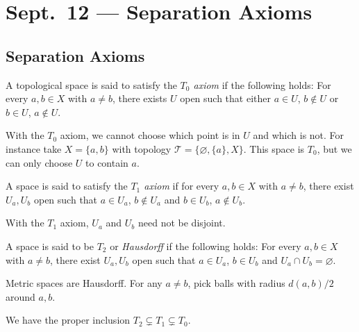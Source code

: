 \chapter{Sept.~12 --- Separation Axioms}

\section{Separation Axioms}
\begin{definition}
  A topological space is said to satisfy the
  \emph{$T_0$ axiom} if the following holds:
  For every $a, b \in X$ with $a \ne b$, there exists
  $U$ open such that either $a \in U$, $b \notin U$
  or $b \in U$, $a \notin U$.
\end{definition}

\begin{remark}
  With the $T_0$ axiom, we cannot choose which
  point is in $U$ and which is not.
  For instance take $X = \{a, b\}$ with topology
  $\mathcal{T} = \{\varnothing, \{a\}, X\}$.
  This space is $T_0$, but we can only choose
  $U$ to contain $a$.
\end{remark}

\begin{definition}
  A space is said to satisfy the \emph{$T_1$ axiom}
  if for every $a, b \in X$ with $a \ne b$,
  there exist $U_a, U_b$ open such that
  $a \in U_a$, $b \notin U_a$ and
  $b \in U_b$, $a \notin U_b$.
\end{definition}

\begin{remark}
  With the $T_1$ axiom, $U_a$ and $U_b$
  need not be disjoint.
\end{remark}

\begin{definition}
  A space is said to be $T_2$ or \emph{Hausdorff}
  if the following holds: For every $a, b \in X$
  with $a \ne b$, there exist $U_a, U_b$ open
  such that $a \in U_a$, $b \in U_b$ and
  $U_a \cap U_b = \varnothing$.
\end{definition}

\begin{example}
  Metric spaces are Hausdorff. For any $a \ne b$,
  pick balls with radius $d(a, b) / 2$ around $a, b$.
\end{example}

\begin{theorem}
  We have the proper inclusion
  $T_2 \subsetneq T_1 \subsetneq T_0$.
\end{theorem}

